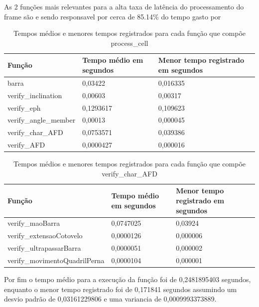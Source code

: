 As 2 funções mais relevantes para a alta taxa de latência do processamento do frame são  e  sendo responsavel por cerca de 85.14\% do tempo gasto por 



\begin{table}[h]
	\centering
	\begin{tabular}{|p{6cm}|p{3cm}|p{5cm}|}
	\hline
	\textbf{Função} & \textbf{Tempo médio em segundos} & \textbf{Menor tempo registrado em segundos} \\
	\hline
	barra & 0,03422 & 0,016335 \\
	verify\_inclination & 0,00603 & 0,00317 \\
	verify\_eph & 0,1293617 & 0,109623 \\
	verify\_angle\_member & 0,00013 & 0,000045 \\
	verify\_char\_AFD & 0,0753571 & 0,039386 \\
	verify\_AFD & 0,0000427 & 0,000016 \\
	\hline
	\end{tabular}
	\caption{Tempos médios e menores tempos registrados para cada função que compõe process\_cell}
	\label{tab:tempos_funcoes}
\end{table}



\begin{table}[h]
	\centering
	\begin{tabular}{|p{6cm}|p{3cm}|p{5cm}|}
	\hline
	\textbf{Função} & \textbf{Tempo médio em segundos} & \textbf{Menor tempo registrado em segundos} \\
	\hline
	verify\_maoBarra & 0,0747025 & 0,03924 \\
	verify\_extensaoCotovelo & 0,0000126 & 0,000006  \\
	verify\_ultrapassarBarra & 0,0000051 & 0,000002  \\
	verify\_movimentoQuadrilPerna & 0,0000104 & 0,000001  \\
	\hline
	\end{tabular}
	\caption{Tempos médios e menores tempos registrados para cada função que compõe verify\_char\_AFD}
	\label{tab:tempos_funcoes_especificas}
\end{table}
	
Por fim  o tempo médio para a execução da função  foi de 0,2481895403 segundos, enquanto o menor tempo registrado foi de 0,171841 segundos assumindo um desvio padrão de 0,03161229806 e uma variancia de 0,0009993373889.

